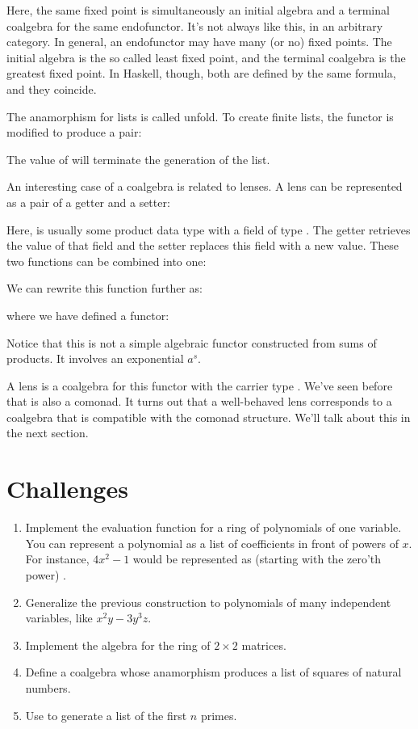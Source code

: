 Here, the same fixed point is simultaneously an initial algebra and a
terminal coalgebra for the same endofunctor. It's not always like this,
in an arbitrary category. In general, an endofunctor may have many (or
no) fixed points. The initial algebra is the so called least fixed
point, and the terminal coalgebra is the greatest fixed point. In
Haskell, though, both are defined by the same formula, and they
coincide.

The anamorphism for lists is called unfold. To create finite lists, the
functor is modified to produce a  pair:

The value of  will terminate the generation of the list.

An interesting case of a coalgebra is related to lenses. A lens can be
represented as a pair of a getter and a setter:

Here,  is usually some product data type with a field of type
. The getter retrieves the value of that field and the setter
replaces this field with a new value. These two functions can be
combined into one:

We can rewrite this function further as:

where we have defined a functor:

Notice that this is not a simple algebraic functor constructed from sums
of products. It involves an exponential $a^s$.

A lens is a coalgebra for this functor with the carrier type .
We've seen before that  is also a comonad. It turns out
that a well-behaved lens corresponds to a coalgebra that is compatible
with the comonad structure. We'll talk about this in the next section.

\section{Challenges}

\begin{enumerate}
\tightlist
\item
  Implement the evaluation function for a ring of polynomials of one
  variable. You can represent a polynomial as a list of coefficients in
  front of powers of $x$. For instance, $4x^2-1$ would be
  represented as (starting with the zero'th power)
  \code{{[}-1, 0, 4{]}}.
\item
  Generalize the previous construction to polynomials of many
  independent variables, like $x^2y-3y^3z$.
\item
  Implement the algebra for the ring of $2\times{}2$ matrices.
\item
  Define a coalgebra whose anamorphism produces a list of squares of
  natural numbers.
\item
  Use  to generate a list of the first $n$ primes.
\end{enumerate}
